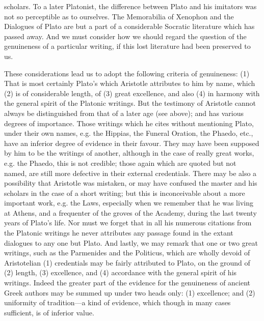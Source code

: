 \documentclass[11pt,letter]{article}
\begin{document}
scholars. To a later Platonist, the difference between Plato and his imitators was not so perceptible as to ourselves. The Memorabilia of Xenophon and the Dialogues of Plato are but a part of a considerable Socratic literature which has passed away. And we must consider how we should regard the question of the genuineness of a particular writing, if this lost literature had been preserved to us.

\par  These considerations lead us to adopt the following criteria of genuineness: (1) That is most certainly Plato's which Aristotle attributes to him by name, which (2) is of considerable length, of (3) great excellence, and also (4) in harmony with the general spirit of the Platonic writings. But the testimony of Aristotle cannot always be distinguished from that of a later age (see above); and has various degrees of importance. Those writings which he cites without mentioning Plato, under their own names, e.g. the Hippias, the Funeral Oration, the Phaedo, etc., have an inferior degree of evidence in their favour. They may have been supposed by him to be the writings of another, although in the case of really great works, e.g. the Phaedo, this is not credible; those again which are quoted but not named, are still more defective in their external credentials. There may be also a possibility that Aristotle was mistaken, or may have confused the master and his scholars in the case of a short writing; but this is inconceivable about a more important work, e.g. the Laws, especially when we remember that he was living at Athens, and a frequenter of the groves of the Academy, during the last twenty years of Plato's life. Nor must we forget that in all his numerous citations from the Platonic writings he never attributes any passage found in the extant dialogues to any one but Plato. And lastly, we may remark that one or two great writings, such as the Parmenides and the Politicus, which are wholly devoid of Aristotelian (1) credentials may be fairly attributed to Plato, on the ground of (2) length, (3) excellence, and (4) accordance with the general spirit of his writings. Indeed the greater part of the evidence for the genuineness of ancient Greek authors may be summed up under two heads only: (1) excellence; and (2) uniformity of tradition—a kind of evidence, which though in many cases sufficient, is of inferior value.
\end{document}
